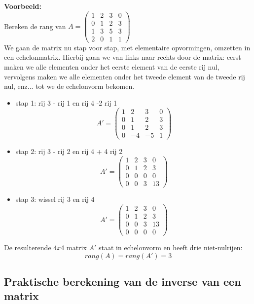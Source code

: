 {\bf Voorbeeld:}\\

Bereken de rang van $A=\left( \begin{matrix}
1 & 2 & 3 & 0 \\
0 & 1 & 2 & 3 \\
1 & 3 & 5 & 3 \\
2 & 0 & 1 & 1
\end{matrix} \right) $\\

We gaan de matrix nu stap voor stap, met elementaire opvormingen, omzetten in een echelonmatrix. Hierbij gaan we van links naar rechts door de matrix: eerst maken we alle elementen onder het eerste element van de eerste rij nul, vervolgens maken we alle elementen onder het tweede element van de tweede rij nul, enz... tot we de echelonvorm bekomen.\\

\begin{itemize}
	\item stap 1: rij 3 - rij 1 en rij 4 -2 rij 1 
	\[ A'=\left( \begin{matrix}
	1 & 2 & 3 & 0 \\
	0 & 1 & 2 & 3 \\
	0 & 1 & 2 & 3 \\
	0 & -4 & -5 & 1 \end{matrix} \right) \] 
	\item stap 2: rij 3 - rij 2 en rij 4 + 4 rij 2
	\[ A'=\left( \begin{matrix}
	1 & 2 & 3 & 0 \\
	0 & 1 & 2 & 3 \\
	0 & 0 & 0 & 0 \\
	0 & 0 & 3 & 13 \end{matrix} \right) \]
	\item stap 3: wissel rij 3 en rij 4 
	\[ A'=\left( \begin{matrix}
	1 & 2 & 3 & 0 \\
	0 & 1 & 2 & 3 \\
	0 & 0 & 3 & 13 \\
	0 & 0 & 0 & 0 \end{matrix} \right) \]
\end{itemize}

De resulterende $4x4$ matrix $A'$ staat in echelonvorm en heeft drie niet-nulrijen: 
\[ rang(A)=rang(A')=3 \]

\subsection{Praktische berekening van de inverse van een matrix}

